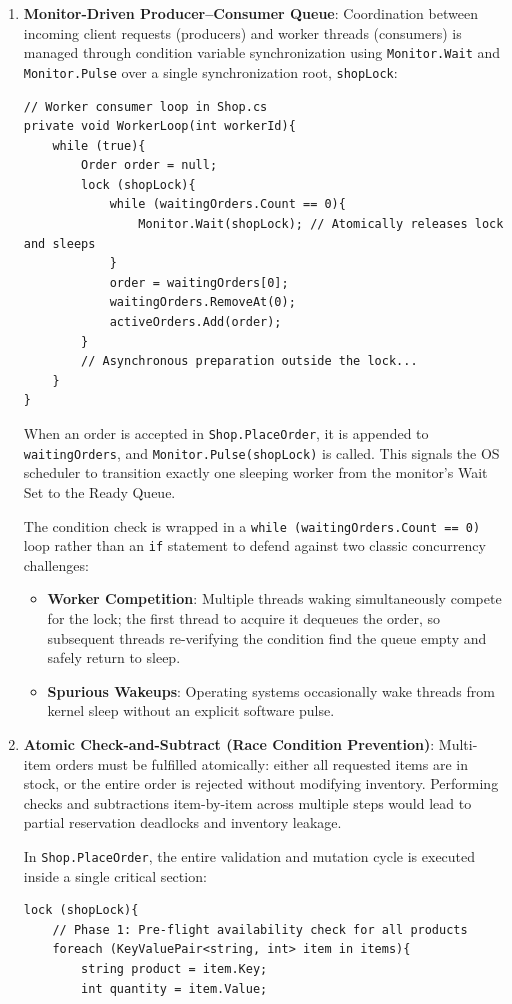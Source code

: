 \documentclass[11pt,a4paper]{article}
\begin{document}
\begin{enumerate}
    \item \textbf{Monitor-Driven Producer--Consumer Queue}:
    Coordination between incoming client requests (producers) and worker threads (consumers) is managed through condition variable synchronization using \texttt{Monitor.Wait} and \texttt{Monitor.Pulse} over a single synchronization root, \texttt{shopLock}:
    \begin{lstlisting}[language={[Sharp]C}]
// Worker consumer loop in Shop.cs
private void WorkerLoop(int workerId){
    while (true){
        Order order = null;
        lock (shopLock){
            while (waitingOrders.Count == 0){
                Monitor.Wait(shopLock); // Atomically releases lock and sleeps
            }
            order = waitingOrders[0];
            waitingOrders.RemoveAt(0);
            activeOrders.Add(order);
        }
        // Asynchronous preparation outside the lock...
    }
}
    \end{lstlisting}
    When an order is accepted in \texttt{Shop.PlaceOrder}, it is appended to \texttt{waitingOrders}, and \texttt{Monitor.Pulse(shopLock)} is called. This signals the OS scheduler to transition exactly one sleeping worker from the monitor's Wait Set to the Ready Queue. 
    
    The condition check is wrapped in a \texttt{while (waitingOrders.Count == 0)} loop rather than an \texttt{if} statement to defend against two classic concurrency challenges:
    \begin{itemize}
        \item \textbf{Worker Competition}: Multiple threads waking simultaneously compete for the lock; the first thread to acquire it dequeues the order, so subsequent threads re-verifying the condition find the queue empty and safely return to sleep.
        \item \textbf{Spurious Wakeups}: Operating systems occasionally wake threads from kernel sleep without an explicit software pulse.
    \end{itemize}

    \item \textbf{Atomic Check-and-Subtract (Race Condition Prevention)}:
    Multi-item orders must be fulfilled atomically: either all requested items are in stock, or the entire order is rejected without modifying inventory. Performing checks and subtractions item-by-item across multiple steps would lead to partial reservation deadlocks and inventory leakage.
    
    In \texttt{Shop.PlaceOrder}, the entire validation and mutation cycle is executed inside a single critical section:
    \begin{lstlisting}[language={[Sharp]C},caption={Atomic inventory verification in Shop.cs}]
lock (shopLock){
    // Phase 1: Pre-flight availability check for all products
    foreach (KeyValuePair<string, int> item in items){
        string product = item.Key;
        int quantity = item.Value;


\end{lstlisting}
\end{enumerate}
\end{document}
